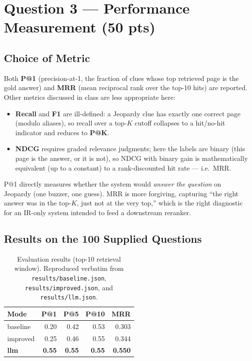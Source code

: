 \documentclass[11pt]{article}
\begin{document}
\section{Question 3 --- Performance Measurement (50 pts)}

\subsection{Choice of Metric}

Both \textbf{P@1} (precision-at-1, the fraction of clues whose top retrieved
page is the gold answer) and \textbf{MRR} (mean reciprocal rank over the
top-10 hits) are reported. Other metrics discussed in class are less
appropriate here:

\begin{itemize}
  \item \textbf{Recall} and \textbf{F1} are ill-defined: a Jeopardy clue has
        exactly one correct page (modulo aliases), so recall over a top-$K$
        cutoff collapses to a hit/no-hit indicator and reduces to \textbf{P@K}.
  \item \textbf{NDCG} requires graded relevance judgments; here the labels are
        binary (this page is the answer, or it is not), so NDCG with binary
        gain is mathematically equivalent (up to a constant) to a
        rank-discounted hit rate --- i.e.\ MRR.
\end{itemize}

P@1 directly measures whether the system would \emph{answer the question} on
Jeopardy (one buzzer, one guess). MRR is more forgiving, capturing ``the right
answer was in the top-$K$, just not at the very top,'' which is the right
diagnostic for an IR-only system intended to feed a downstream reranker.

\subsection{Results on the 100 Supplied Questions}

\begin{table}[h]
\centering
\begin{tabular}{lrrrr}
\toprule
\textbf{Mode} & \textbf{P@1} & \textbf{P@5} & \textbf{P@10} & \textbf{MRR} \\
\midrule
baseline             & 0.20 & 0.42 & 0.53 & 0.303 \\
improved             & 0.25 & 0.46 & 0.55 & 0.344 \\
\textbf{llm} & \textbf{0.55} & \textbf{0.55} & \textbf{0.55} & \textbf{0.550} \\
\bottomrule
\end{tabular}
\caption{Evaluation results (top-10 retrieval window). Reproduced verbatim
from \texttt{results/baseline.json}, \texttt{results/improved.json}, and
\texttt{results/llm.json}.}
\end{table}
\end{document}
